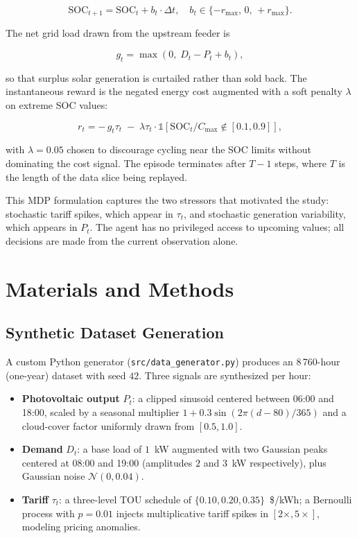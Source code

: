 \documentclass[conference]{IEEEtran}
\begin{document}
\begin{equation}
    \mathrm{SOC}_{t+1} = \mathrm{SOC}_t + b_t \cdot \Delta t,
    \quad b_t \in \{-r_{\max},\, 0,\, +r_{\max}\}.
\end{equation}

The net grid load drawn from the upstream feeder is

\begin{equation}
    g_t = \max(0,\; D_t - P_t + b_t),
\end{equation}

so that surplus solar generation is curtailed rather than sold back. The instantaneous reward is the negated energy cost augmented with a soft penalty $\lambda$ on extreme SOC values:

\begin{equation}
    r_t = -\,g_t \tau_t \;-\; \lambda \tau_t \cdot \mathbb{1}\!\left[\mathrm{SOC}_t/C_{\max} \notin [0.1, 0.9]\right],
    \label{eq:reward}
\end{equation}

with $\lambda = 0.05$ chosen to discourage cycling near the SOC limits without dominating the cost signal. The episode terminates after $T - 1$ steps, where $T$ is the length of the data slice being replayed.

This MDP formulation captures the two stressors that motivated the study: stochastic tariff spikes, which appear in $\tau_t$, and stochastic generation variability, which appears in $P_t$. The agent has no privileged access to upcoming values; all decisions are made from the current observation alone.

\section{Materials and Methods}
\label{sec:materiais}

\subsection{Synthetic Dataset Generation}
\label{ssec:data}

A custom Python generator (\texttt{src/data\_generator.py}) produces an 8\,760-hour (one-year) dataset with seed $42$. Three signals are synthesized per hour:

\begin{itemize}
    \item \textbf{Photovoltaic output} $P_t$: a clipped sinusoid centered between 06:00 and 18:00, scaled by a seasonal multiplier $1 + 0.3\sin(2\pi(d - 80)/365)$ and a cloud-cover factor uniformly drawn from $[0.5, 1.0]$.
    \item \textbf{Demand} $D_t$: a base load of $1$~kW augmented with two Gaussian peaks centered at 08:00 and 19:00 (amplitudes $2$ and $3$~kW respectively), plus Gaussian noise $\mathcal{N}(0, 0.04)$.
    \item \textbf{Tariff} $\tau_t$: a three-level TOU schedule of $\{0.10, 0.20, 0.35\}$~\$/kWh; a Bernoulli process with $p = 0.01$ injects multiplicative tariff spikes in $[2{\times}, 5{\times}]$, modeling pricing anomalies.
\end{itemize}
\end{document}
